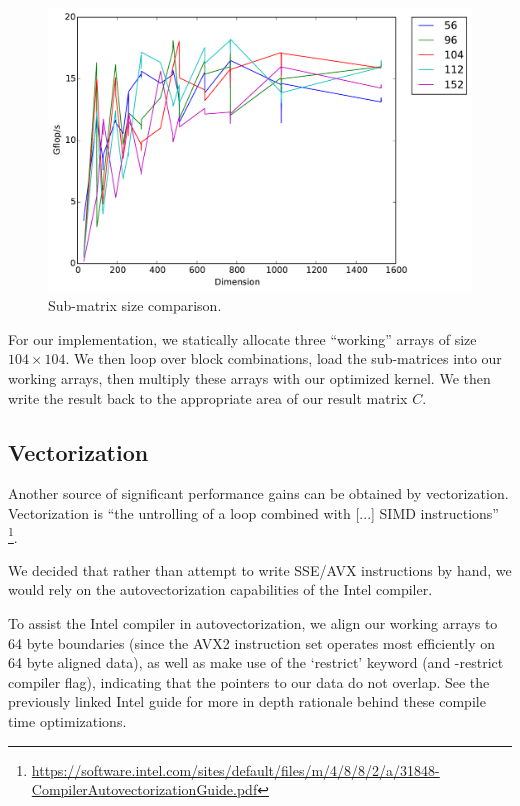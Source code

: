 \documentclass[fontsize=11pt]{scrartcl}
\numberwithin{equation}{section}        %
\numberwithin{figure}{section}          %
\numberwithin{table}{section}               %
\begin{document}
\begin{figure}[h]
    \centering
    \includegraphics[width=5.0in]{../final_timings/timing_block_size.pdf}
    \caption{Sub-matrix size comparison.}
    \label{fig:block_size}
\end{figure}

For our implementation, we statically allocate three ``working'' arrays of size
$104 \times 104$.  We then loop over block combinations, load the sub-matrices 
into our working arrays, then multiply these arrays with our optimized kernel.
We then write the result back to the appropriate area of our result matrix $C$.

\subsection{Vectorization}
Another source of significant performance gains can be obtained by vectorization.
Vectorization is ``the untrolling of a loop combined with [...] SIMD instructions''
\footnote{\url{https://software.intel.com/sites/default/files/m/4/8/8/2/a/31848-CompilerAutovectorizationGuide.pdf}}.

We decided that rather than attempt to write SSE/AVX instructions by hand, we 
would rely on the autovectorization capabilities of the Intel compiler.

To assist the Intel compiler in autovectorization, we align our working arrays
to 64 byte boundaries (since the AVX2 instruction set operates most efficiently
on 64 byte aligned data), as well as make use of the `restrict' keyword 
(and -restrict compiler flag), indicating that the pointers to our data do not 
overlap.  See the previously linked Intel guide for more in depth rationale 
behind these compile time optimizations.
\end{document}
